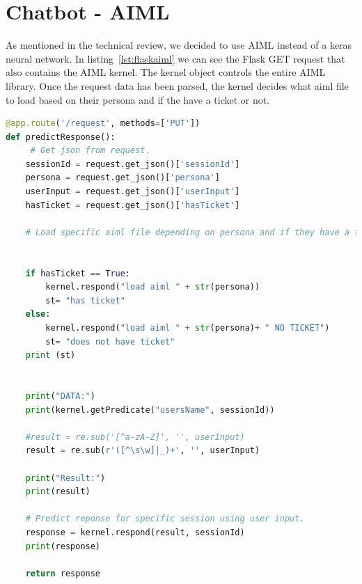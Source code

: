 \section{Chatbot - AIML}
As mentioned in the technical review, we decided to use AIML instead of a keras neural network. In listing~\ref{lst:flaskaiml} we can see the Flask GET request that also contains the AIML kernel. The kernel object controls the entire AIML library. Once the request data has been parsed, the kernel decides what aiml file to load based on their persona and if the have a ticket or not.

    \begin{lstlisting}[caption={Generate AIML response},label={lst:flaskaiml},language=python]
@app.route('/request', methods=['PUT'])
def predictResponse():
     # Get json from request.
    sessionId = request.get_json()['sessionId']
    persona = request.get_json()['persona']
    userInput = request.get_json()['userInput']
    hasTicket = request.get_json()['hasTicket']

    # Load specific aiml file depending on persona and if they have a ticket.


    if hasTicket == True:
        kernel.respond("load aiml " + str(persona))
        st= "has ticket"
    else:
        kernel.respond("load aiml " + str(persona)+ " NO TICKET")
        st= "does not have ticket"
    print (st)


    print("DATA:")
    print(kernel.getPredicate("usersName", sessionId))

    #result = re.sub('[^a-zA-Z]', '', userInput)
    result = re.sub(r'([^\s\w]|_)+', '', userInput)

    print("Result:")
    print(result)

    # Predict reponse for specific session using user input.
    response = kernel.respond(result, sessionId)
    print(response)

    return response

\end{lstlisting}

